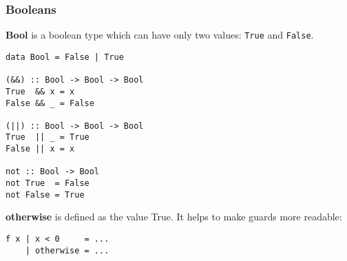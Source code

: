 %

\subsubsection{Booleans}
\textbf{Bool} is a boolean type which can have only two values: \texttt{True} and  \texttt{False}.

\begin{verbatim}
data Bool = False | True

(&&) :: Bool -> Bool -> Bool
True  && x = x
False && _ = False

(||) :: Bool -> Bool -> Bool
True  || _ = True
False || x = x

not :: Bool -> Bool
not True  = False
not False = True
\end{verbatim}

\textbf{otherwise} is defined as the value True. It helps to make guards more readable:
\begin{verbatim}
f x | x < 0     = ...
    | otherwise = ...
\end{verbatim}

%